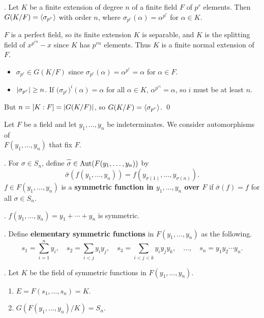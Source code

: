 \thm. Let \(K\) be a finite extension of degree \(n\) of a finite field \(F\) of \(p^r\) elements. Then \(G(K/F) = \left\langle \sigma_{p^r} \right\rangle\) with order \(n\), where \(\sigma_{p^r}(\alpha) = \alpha^{p^r}\) for \(\alpha \in K\).

\pf \(F\) is a perfect field, so its finite extension \(K\) is separable, and \(K\) is the splitting field of \(x^{p^{rn}} - x\) since \(K\) has \(p^{rn}\) elements. Thus \(K\) is a finite normal extension of \(F\).
\begin{itemize}
    \item \(\sigma_{p^r} \in G(K/F)\) since \(\sigma_{p^r}(\alpha) = \alpha^{p^r} = \alpha\) for \(\alpha \in F\).
    \item \(\left| \sigma_{p^r} \right| \geq n\). If \(\bigl(\sigma_{p^r}\bigr)^i(\alpha) = \alpha\) for all \(\alpha \in K\), \(\alpha^{p^{ri}} = \alpha\), so \(i\) must be at least \(n\).
\end{itemize}
But \(n = [K : F] = \left| G(K/F) \right|\), so \(G(K/F) = \left\langle \sigma_{p^r} \right\rangle\). \qed


Let \(F\) be a field and let \(y_1, \dots, y_n\) be indeterminates. We consider automorphisms of \\\(F(y_1, \dots, y_n)\) that fix \(F\).

.  For \(\sigma \in S_n\), define \(\bar{\sigma} \in \Aut(F(y_1, \dots, y_n))\) by
\[
    \bar{\sigma}(f(y_1, \dots, y_n)) = f(y_{\sigma(1)}, \dots, y_{\sigma(n)}).
\]
\(f \in F(y_1, \dots, y_n)\) is a \textbf{symmetric function in \(y_1, \dots, y_n\) over \(F\)} if \(\bar{\sigma}(f) = f\) for all \(\sigma \in S_n\).

\ex. \(f(y_1, \dots, y_n) = y_1 + \cdots + y_n\) is symmetric.

\pagebreak

.  Define \textbf{elementary symmetric functions} in \(F(y_1, \dots, y_n)\) as the following.
\[
    s_1 = \sum_{i=1}^n y_i, \quad s_2 = \sum_{i < j} y_i y_j, \quad s_3 = \sum_{i < j < k} y_i y_j y_k, \quad \dots, \quad s_n = y_1 y_2 \cdots y_n.
\]



\thm. Let \(K\) be the field of symmetric functions in \(F(y_1, \dots, y_n)\).
\begin{enumerate}
    \item \(E = F(s_1, \dots, s_n) = K\).
    \item \(G(F(y_1, \dots, y_n)/K) = S_n\).
\end{enumerate}

